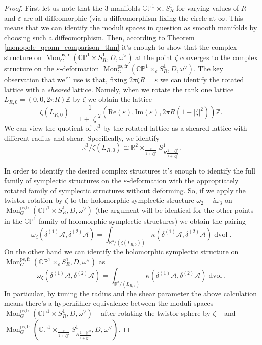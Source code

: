 \documentclass[11pt, oneside, reqno]{amsart}
\theoremstyle{definition} \newtheorem{definition}{Definition}[section]
\theoremstyle{definition} \newtheorem{remark}[definition]{Remark}
\theoremstyle{definition} \newtheorem{remarks}[definition]{Remarks}
\theoremstyle{definition} \newtheorem{question}[definition]{Question}
\theoremstyle{definition} \newtheorem*{note}{Note}
\theoremstyle{definition} \newtheorem{example}[definition]{Example}
\theoremstyle{definition} \newtheorem{examples}[definition]{Examples}
\newcommand{\bb}[1]{\mathbb{#1}}
\newcommand{\mr}[1]{\mathrm{#1}}
\newcommand{\mc}[1]{\mathcal{#1}}
\newcommand{\RR}{\mathbb{R}}
\newcommand{\ZZ}{\mathbb{Z}}
\newcommand{\eps}{\varepsilon}
\newcommand{\iso}{\cong}
\DeclareMathOperator{\dvol}{dvol}
\DeclareMathOperator{\mon}{Mon}
\newcommand{\fr}{\mathrm{fr}}
\begin{document}
\begin{proof}
First let us note that the 3-manifolds $\bb{CP}^1 \times_\eps S^1_R$ for varying values of $R$ and $\eps$ are all diffeomorphic (via a diffeomorphism fixing the circle at $\infty$.  This means that we can identify the moduli spaces in question as smooth manifolds by choosing such a diffeomorphism.  Then, according to Theorem \ref{monopole_qconn_comparison_thm} it's enough to show that the complex structure on $\mon_G^{\text{ps,fr}}(\bb{CP}^1 \times S^1_R,D,\omega^\vee)$ at the point $\zeta$ converges to the complex structure on the $\eps$-deformation $\mon_G^{\mr{ps},\fr}(\bb{CP}^1 \times_\eps S^1_R,D,\omega^\vee)$.  The key observation that we'll use is that, fixing $2 \pi \zeta R = \eps$ we can identify the rotated lattice with a \emph{sheared} lattice.  Namely, when we rotate the rank one lattice $L_{R,0} = (0,0,2\pi R)\ZZ$ by $\zeta$ we obtain the lattice
\[\zeta(L_{R,0}) = \frac {1}{1+|\zeta|^2} (\mr{Re}(\eps), \mr{Im}(\eps), 2\pi R (1-|\zeta|^2) )\ZZ.\]
We can view the quotient of $\RR^3$ by the rotated lattice as a sheared lattice with different radius and shear.  Specifically, we identify
\[\RR^3 / \zeta(L_{R,0}) \iso \RR^2 \times_{\frac{\eps}{1+|\zeta|^2}} S^1_{R \frac {1-|\zeta|^2}{1+|\zeta|^2}}.\]

In order to identify the desired complex structures it's enough to identify the full family of symplectic structures on the $\eps$-deformation with the appropriately rotated family of symplectic structures without deforming.  So, if we apply the twistor rotation by $\zeta$ to the holomorphic symplectic structure $\omega_2 + i\omega_3$ on $\mon_G^{\text{ps,fr}}(\bb{CP}^1 \times S^1_R,D,\omega^\vee)$ (the argument will be identical for the other points in the $\bb{CP}^1$ family of holomorphic symplectic structures) we obtain the pairing
\[\omega_\zeta(\delta^{(1)}\mc A, \delta^{(2)}\mc A) = \int_{\RR^3/(\zeta(L_{R,0}))} \kappa(\delta^{(1)} \mc A, \delta^{(2)} \mc A) \dvol.\]
On the other hand we can identify the holomorphic symplectic structure on $\mon_G^{\mr{ps},\fr}(\bb{CP}^1 \times_\eps S^1_R,D,\omega^\vee)$ as
\[\omega_\zeta(\delta^{(1)}\mc A, \delta^{(2)}\mc A) = \int_{\RR^3/(L_{R,\eps})} \kappa(\delta^{(1)} \mc A, \delta^{(2)} \mc A) \dvol.\]
In particular, by tuning the radius and the shear parameter the above calculation means there's a hyperk\"ahler equivalence between the moduli spaces $\mon_G^{\text{ps,fr}}(\bb{CP}^1 \times S^1_R,D,\omega^\vee)$ -- after rotating the twistor sphere by $\zeta$ -- and $\mon_G^{\mr{ps},\fr}(\bb{CP}^1 \times_{\frac{\eps}{1+|\zeta|^2}} S^1_{R \frac {1-|\zeta|^2}{1+|\zeta|^2}},D,\omega^\vee)$.  


\end{proof}
\end{document}
